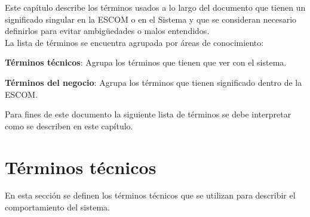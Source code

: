 Este capítulo describe los términos usados a lo largo del documento que tienen un significado singular en la ESCOM o en el Sistema y que se consideran necesario definirlos para evitar ambigüedades o malos entendidos.\\

La lista de términos se encuentra agrupada por áreas de conocimiento:

\begin{Citemize}
	
	\item \textbf{Términos técnicos}: Agrupa los términos que tienen que ver con el sistema.
	
	\item \textbf{Términos del negocio}: Agrupa los términos que tienen significado dentro de la ESCOM.
	
\end{Citemize}

Para fines de este documento la siguiente lista de términos se debe interpretar como se describen en este capítulo.

\section{Términos técnicos}\label{sec:terminosTecnicos}

En esta sección se definen los términos técnicos que se utilizan para describir el comportamiento del sistema.

